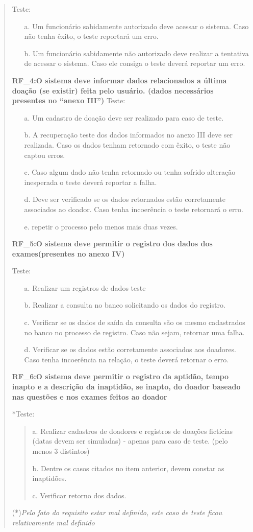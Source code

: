\documentclass[12pt,a4paper]{report}
\begin{document}
\begin{quotation}
Teste:
\begin{itemize}
\item[a.] Um funcionário sabidamente autorizado deve acessar o sistema. Caso não tenha êxito, o teste reportará um erro.
\item[b.] Um funcionário sabidamente não autorizado deve realizar a tentativa de acessar o sistema. Caso ele consiga o teste deverá reportar um erro.
\end{itemize}
\textbf{RF\_4:O sistema deve informar dados relacionados a última doação (se existir) feita pelo usuário. (dados necessários presentes no “anexo III”)}
Teste:
\begin{itemize}
\item[a.] Um cadastro de doação deve ser realizado para caso de teste.
\item[b.] A recuperação teste dos dados informados no anexo III deve ser realizada. Caso os dados tenham retornado com êxito, o teste não captou erros.
\item[c.] Caso algum dado não tenha retornado ou tenha sofrido alteração inesperada o teste deverá reportar a falha.
\item[d.] Deve ser verificado se os dados retornados estão corretamente associados ao doador. Caso tenha incoerência o teste retornará o erro.
\item[e.] repetir o processo pelo menos mais duas vezes.
\end{itemize}

\textbf{RF\_5:O sistema  deve permitir o registro dos dados dos exames(presentes no anexo IV)}

Teste:
\begin{itemize}
\item[a.] Realizar um registros de dados teste
\item[b.] Realizar a consulta no banco solicitando os dados do registro.
\item[c.] Verificar se os dados de saída da consulta são os mesmo cadastrados no banco no processo de registro. Caso não sejam, retornar uma falha.
\item[d.] Verificar se os dados estão corretamente associados aos doadores. Caso tenha incoerência na relação, o teste deverá retornar o erro. 
\end{itemize}

\textbf{RF\_6:O sistema deve permitir o registro da aptidão, tempo inapto e a descrição da inaptidão, se inapto, do doador baseado nas questões e nos exames feitos ao doador}

*Teste:
\begin{quotation}
\item[a.] Realizar cadastros de doadores e registros de doações fictícias (datas devem ser simuladas) - apenas para caso de teste. (pelo menos 3 distintos)
\item[b.] Dentre os casos citados no item anterior, devem constar as inaptidões.
\item[c.] Verificar retorno dos dados. 
\end{quotation}
(*)\textit{Pelo fato do requisito estar mal definido, este caso de teste ficou relativamente mal definido}
\end{quotation}
\end{document}
